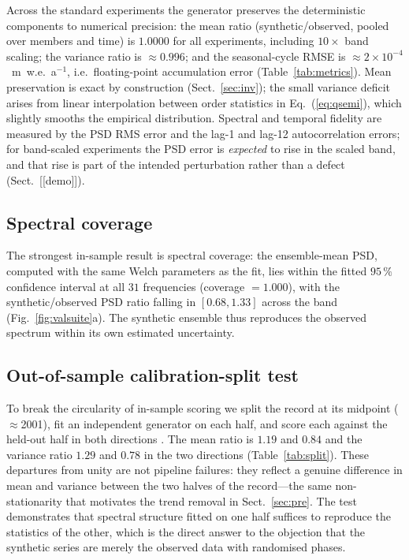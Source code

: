 Across the standard experiments the generator preserves the deterministic
components to numerical precision: the mean ratio (synthetic/observed,
pooled over members and time) is
$1.0000$ for all experiments, including $10\times$ band scaling; the
variance ratio is $\approx0.996$; and the seasonal-cycle RMSE is
$\approx2\times10^{-4}$~m~w.e.~a$^{-1}$, i.e.\ floating-point accumulation
error (Table~\ref{tab:metrics}). Mean preservation is exact by construction
(Sect.~\ref{sec:inv}); the small variance deficit arises from linear
interpolation between order statistics in Eq.~(\ref{eq:qsemi}), which
slightly smooths the empirical distribution. Spectral and temporal fidelity
are measured
by the PSD RMS error and the lag-1 and lag-12 autocorrelation errors; for
band-scaled experiments the PSD error is \emph{expected} to rise in the
scaled band, and that rise is part of the intended perturbation rather than
a defect (Sect.~[[demo]]).

\subsection{Spectral coverage}

The strongest in-sample result is spectral coverage: the ensemble-mean PSD,
computed with the same Welch parameters as the fit, lies within the fitted
$95\,\%$ confidence interval at all $31$ frequencies (coverage $=1.000$),
with the synthetic/observed PSD ratio falling in $[0.68,1.33]$ across the
band (Fig.~\ref{fig:valsuite}a). The synthetic ensemble thus reproduces the
observed spectrum within its own estimated uncertainty.

\subsection{Out-of-sample calibration-split test}

To break the circularity of in-sample scoring we split the record at its
midpoint ($\approx$2001), fit an independent generator on each half, and
score each against the held-out half in both directions
\citep{michaelsen1987}. The mean ratio is $1.19$ and $0.84$ and the variance
ratio $1.29$ and $0.78$ in the two directions (Table~\ref{tab:split}). These
departures from unity are not pipeline failures: they reflect a genuine
difference in mean and variance between the two halves of the record---the
same non-stationarity that motivates the trend removal in
Sect.~\ref{sec:pre}. The test demonstrates that spectral structure fitted on
one half suffices to reproduce the statistics of the other, which is the
direct answer to the objection that the synthetic series are merely the
observed data with randomised phases.

